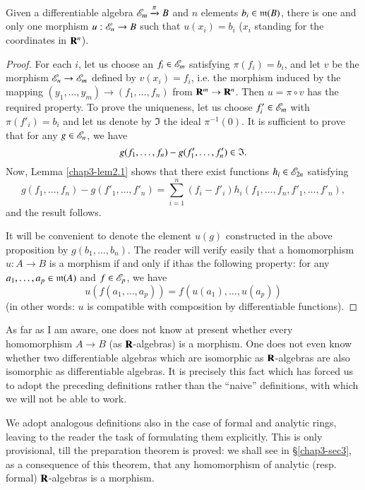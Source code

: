 \begin{proposition}\label{chap3-prop2.3}
Given a differentiable algebra $\mathscr{E}_{m}\xrightarrow{\pi}B$ and $n$ elements $b_{i}\in \mathfrak{m}(B)$, there is one and only one morphism $u:\mathscr{E}_{n}\to B$ such that $u(x_{i})=b_{i}$ ($x_{i}$ standing for the coordinates in $\mathbf{R}^{n}$).
\end{proposition}

\begin{proof}
For each $i$, let us choose an $f_{i}\in \mathscr{E}_{m}$ satisfying $\pi(f_{i})=b_{i}$, and let $v$ be the morphism $\mathscr{E}_{n}\to \mathscr{E}_{m}$ defined by $v(x_{i})=f_{i}$, i.e. the morphism induced by the mapping $(y_{1},\ldots,y_{m})\to (f_{1},\ldots,f_{n})$ from $\mathbf{R}^{m}\to \mathbf{R}^{n}$. Then $u=\pi\circ v$ has the required property. To prove the uniqueness, let us choose $f'_{i}\in \mathscr{E}_{m}$ with $\pi(f'_{i})=b_{i}$ and let us denote by $\mathfrak{I}$ the ideal $\pi^{-1}(0)$. It is sufficient to prove that for any $g\in \mathscr{E}_{n}$, we have
$$
g(f_{1},\ldots,f_{n})-g(f'_{1},\ldots,f'_{n})\in \mathfrak{I}.
$$
Now, Lemma \ref{chap3-lem2.1} shows that there exist functions $h_{i}\in \mathscr{E}_{2n}$ satisfying
$$
g(f_{1},\ldots,f_{n})-g(f'_{1},\ldots,f'_{n})=\sum\limits^{n}_{i=1}(f_{i}-f'_{i})h_{i}(f_{1},\ldots,f_{n},f'_{1},\ldots,f'_{n}),
$$
and the result follows.

It will be convenient to denote the element $u(g)$ constructed in the above proposition by $g(b_{1},\ldots,b_{n})$. The reader will verify easily that a homomorphism $u:A\to B$ is a morphism if and only if it\pageoriginale has the following property: for any $a_{1},\ldots,a_{p}\in \mathfrak{m}(A)$ and $f\in\mathscr{E}_{p}$, we have
$$
u(f(a_{1},\ldots,a_{p}))=f(u(a_{1}),\ldots,u(a_{p}))
$$
(in other words: $u$ is compatible with composition by differentiable functions).
\end{proof}

\begin{remark}\label{chap3-rem2.4}
As far as I am aware, one does not know at present whether every homomorphism $A\to B$ (as $\mathbf{R}$-algebras) is a morphism. One does not even know whether two differentiable algebras which are isomorphic as $\mathbf{R}$-algebras are also isomorphic as differentiable algebras. It is precisely this fact which has forced us to adopt the preceding definitions rather than the ``naive'' definitions, with which we will not be able to work.

We adopt analogous definitions also in the case of formal and analytic rings, leaving to the reader the task of formulating them explicitly. This is only provisional, till the preparation theorem is proved: we shall see in \S\ref{chap3-sec3}, as a consequence of this theorem, that any homomorphism of analytic (resp. formal) $\mathbf{R}$-algebras is a morphism.
\end{remark}

